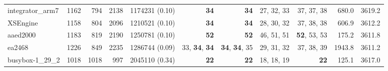\begin{table*}
\begin{tiny}
{{\begin{tabular}{lrrrrrrrrrr}
integrator\_arm7 & \num[text-series-to-math=true]{1162} & \num[text-series-to-math=true]{794} & \num[text-series-to-math=true]{2138} & \num[text-series-to-math=true]{1174231} (\num[text-series-to-math=true]{0.10}) & \textbf{\num[text-series-to-math=true]{34}} & \textbf{\num[text-series-to-math=true]{34}} & \num[text-series-to-math=true]{27}, \num[text-series-to-math=true]{32}, \num[text-series-to-math=true]{33} & \num[text-series-to-math=true]{37}, \num[text-series-to-math=true]{37}, \num[text-series-to-math=true]{38} & 680.0 & 3619.2\\
XSEngine & \num[text-series-to-math=true]{1158} & \num[text-series-to-math=true]{804} & \num[text-series-to-math=true]{2096} & \num[text-series-to-math=true]{1210521} (\num[text-series-to-math=true]{0.10}) & \textbf{\num[text-series-to-math=true]{34}} & \textbf{\num[text-series-to-math=true]{34}} & \num[text-series-to-math=true]{28}, \num[text-series-to-math=true]{30}, \num[text-series-to-math=true]{32} & \num[text-series-to-math=true]{37}, \num[text-series-to-math=true]{38}, \num[text-series-to-math=true]{38} & 606.9 & 3612.2\\
aaed2000 & \num[text-series-to-math=true]{1183} & \num[text-series-to-math=true]{819} & \num[text-series-to-math=true]{2190} & \num[text-series-to-math=true]{1250781} (\num[text-series-to-math=true]{0.10}) & \textbf{\num[text-series-to-math=true]{52}} & \textbf{\num[text-series-to-math=true]{52}} & \num[text-series-to-math=true]{46}, \num[text-series-to-math=true]{51}, \num[text-series-to-math=true]{51} & \textbf{\num[text-series-to-math=true]{52}}, \num[text-series-to-math=true]{53}, \num[text-series-to-math=true]{53} & 175.2 & 3611.8\\
ea2468 & \num[text-series-to-math=true]{1226} & \num[text-series-to-math=true]{849} & \num[text-series-to-math=true]{2235} & \num[text-series-to-math=true]{1286744} (\num[text-series-to-math=true]{0.09}) & \num[text-series-to-math=true]{33}, \textbf{\num[text-series-to-math=true]{34}}, \textbf{\num[text-series-to-math=true]{34}} & \textbf{\num[text-series-to-math=true]{34}}, \textbf{\num[text-series-to-math=true]{34}}, \num[text-series-to-math=true]{35} & \num[text-series-to-math=true]{29}, \num[text-series-to-math=true]{31}, \num[text-series-to-math=true]{32} & \num[text-series-to-math=true]{37}, \num[text-series-to-math=true]{38}, \num[text-series-to-math=true]{39} & 1943.8 & 3611.2\\
busybox-1\_29\_2 & \num[text-series-to-math=true]{1018} & \num[text-series-to-math=true]{1018} & \num[text-series-to-math=true]{997} & \num[text-series-to-math=true]{2045110} (\num[text-series-to-math=true]{0.34}) & \textbf{\num[text-series-to-math=true]{22}} & \textbf{\num[text-series-to-math=true]{22}} & \num[text-series-to-math=true]{18}, \num[text-series-to-math=true]{18}, \num[text-series-to-math=true]{19} & \textbf{\num[text-series-to-math=true]{22}} & 125.1 & 3617.0\\

\end{tabular}}}
\end{tiny}
\end{table*}
